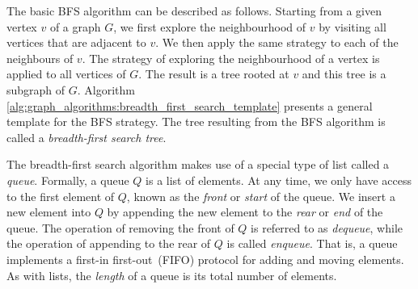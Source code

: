 The basic BFS algorithm can be described as follows. 
Starting from a given vertex $v$ of a graph $G$, we first explore the neighbourhood of $v$ by visiting all vertices that are adjacent to $v$. 
We then apply the same strategy to each of the neighbours of $v$. The strategy of exploring the neighbourhood of a vertex is applied to all vertices of $G$. 
The result is a tree rooted at $v$ and this tree is a subgraph of
$G$. 
Algorithm~ \ref{alg:graph_algorithms:breadth_first_search_template}
presents a general template for the BFS strategy. The tree resulting
from the BFS algorithm is called a \emph{breadth-first search tree}.


The breadth-first search algorithm makes use of a special type of list called a \emph{queue}. 
Formally, a queue $Q$ is a list of elements. 
At any time, we only have access to the first element of $Q$, known as the \emph{front} or \emph{start} of the queue. We insert
a new element into $Q$ by appending the new element to the \emph{rear} or \emph{end} of the queue. 
The operation of removing the front of $Q$ is referred to as \emph{dequeue}, while the operation of appending to the rear of $Q$ is called \emph{enqueue}. 
That is, a queue implements a first-in first-out~(FIFO) protocol for adding and moving elements. 
As with lists, the \emph{length} of a queue is its total number of elements.

